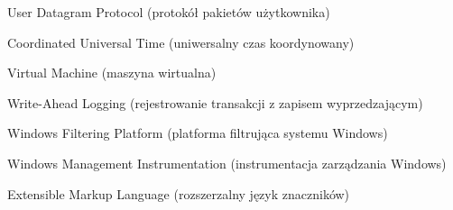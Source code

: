 \begin{abbreviations}
    \item[UDP]     User Datagram Protocol (protokół pakietów użytkownika)
    \item[UTC]     Coordinated Universal Time (uniwersalny czas koordynowany)
    \item[VM]      Virtual Machine (maszyna wirtualna)
    \item[WAL]     Write-Ahead Logging (rejestrowanie transakcji z zapisem wyprzedzającym)
    \item[WFP]     Windows Filtering Platform (platforma filtrująca systemu Windows)
    \item[WMI]     Windows Management Instrumentation (instrumentacja zarządzania Windows)
    \item[XML]     Extensible Markup Language (rozszerzalny język znaczników)
\end{abbreviations}
